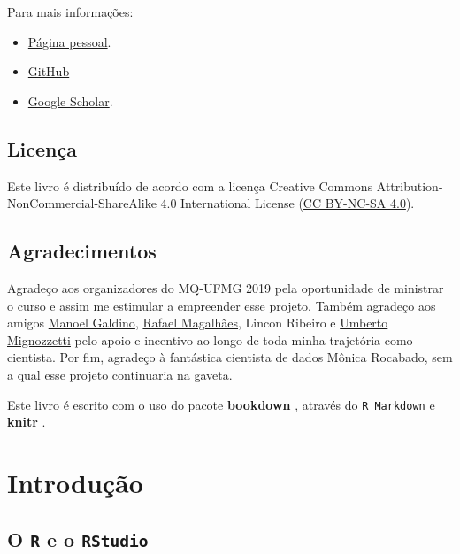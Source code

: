 \documentclass[]{book}
\begin{document}
Para mais informações:

\begin{itemize}
\item
  \href{https://davimoreira.com/}{Página pessoal}.
\item
  \href{https://github.com/davi-moreira}{GitHub}
\item
  \href{https://scholar.google.com.br/citations?hl=pt-BR\&user=dS9bbdMAAAAJ}{Google Scholar}.
\end{itemize}

\hypertarget{licenuxe7a}{%
\section*{Licença}\label{licenuxe7a}}

Este livro é distribuído de acordo com a licença Creative Commons Attribution-NonCommercial-ShareAlike 4.0 International License (\href{https://creativecommons.org/licenses/by-nc-sa/4.0/}{CC BY-NC-SA 4.0}).

\hypertarget{agradecimentos}{%
\section*{Agradecimentos}\label{agradecimentos}}

Agradeço aos organizadores do MQ-UFMG 2019 pela oportunidade de ministrar o curso e assim me estimular a empreender esse projeto. Também agradeço aos amigos \href{https://sites.google.com/site/galdinomcz/}{Manoel Galdino}, \href{http://lattes.cnpq.br/8040086656965973}{Rafael Magalhães}, Lincon Ribeiro e \href{https://umbertomig.com/}{Umberto Mignozzetti} pelo apoio e incentivo ao longo de toda minha trajetória como cientista. Por fim, agradeço à fantástica cientista de dados Mônica Rocabado, sem a qual esse projeto continuaria na gaveta.

Este livro é escrito com o uso do pacote \textbf{bookdown} \citep{R-bookdown}, através do \texttt{R\ Markdown} e \textbf{knitr} \citep{xie2015}.

\hypertarget{intro}{%
\chapter{Introdução}\label{intro}}

\hypertarget{o-r-e-o-rstudio}{%
\section{\texorpdfstring{O \texttt{R} e o \texttt{RStudio}}{O R e o RStudio}}\label{o-r-e-o-rstudio}}
\end{document}
